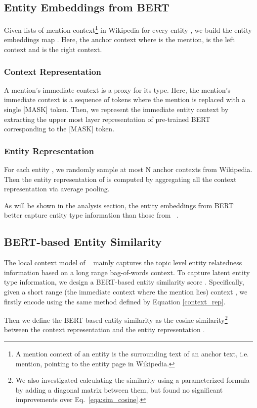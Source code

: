 \documentclass[letterpaper]{article} \usepackage{aaai20}  \usepackage{times}  \usepackage{helvet} \usepackage{courier}  \usepackage[hyphens]{url}  \usepackage{graphicx} \urlstyle{rm} \def\UrlFont{\rm}  \usepackage{graphicx}  \frenchspacing  \setlength{\pdfpagewidth}{8.5in}  \setlength{\pdfpageheight}{11in}  \usepackage{multirow}
\newcommand{\namecite}[1]{\citeauthor{#1}~\shortcite{#1}}
\begin{document}
\subsection{Entity Embeddings from BERT}
Given lists of mention context\footnote{A mention context of an entity is the surrounding text of an anchor text, i.e. mention, pointing to the entity page in Wikipedia.}  in Wikipedia for every entity , we build the entity embeddings map . Here, the anchor context  where  is the mention,  is the left context and  is the right context. 
\subsubsection{Context Representation}
A mention's immediate context is a proxy for its type. Here, the mention's immediate context is a sequence of tokens where the mention  is replaced with a single [MASK] token. Then, we represent the immediate entity context by extracting the upper most layer representation of pre-trained BERT \cite{devlin-etal-2019-bert} corresponding to the [MASK] token. 


\subsubsection{Entity Representation}
For each entity , we randomly sample at most N anchor contexts  from Wikipedia. Then the entity representation of  is computed by aggregating all the context representation  via average pooling. 

As will be shown in the analysis section, the entity embeddings from BERT better capture entity type information than those from \namecite{ganea2017deep}.

\subsection{BERT-based Entity Similarity}
The local context model of \namecite{ganea2017deep} mainly captures the topic level entity relatedness information based on a long range bag-of-words context. To capture latent entity type information, we design a BERT-based entity similarity score . Specifically, given a short range (the immediate context where the mention  lies) context , we firstly encode  using the same method defined by Equation \ref{context_rep}.

Then we define the BERT-based entity similarity as the cosine similarity\footnote{We also investigated calculating the similarity using a parameterized formula by adding a diagonal matrix between them, but found no significant improvements over Eq.~\ref{eqa:sim_cosine}.} between the context representation  and the entity representation .
\end{document}
